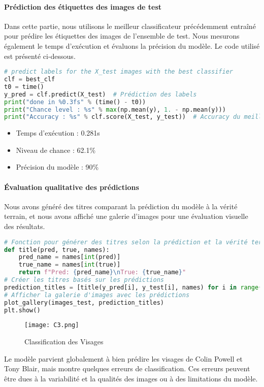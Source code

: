 \documentclass[12pt,a4paper]{report}
\begin{document}
\paragraph{Prédiction des étiquettes des images de test\\}

Dans cette partie, nous utilisons le meilleur classificateur précédemment entraîné pour prédire les étiquettes des images de l'ensemble de test. Nous mesurons également le temps d'exécution et évaluons la précision du modèle. Le code utilisé est présenté ci-dessous.

\begin{lstlisting}[language=Python, caption=Prédiction des étiquettes des images de test avec le meilleur classificateur]
# predict labels for the X_test images with the best classifier
clf = best_clf
t0 = time()
y_pred = clf.predict(X_test)  # Prédiction des labels
print("done in %0.3fs" % (time() - t0))
print("Chance level : %s" % max(np.mean(y), 1. - np.mean(y)))
print("Accuracy : %s" % clf.score(X_test, y_test))  # Accuracy du meilleur modèle
\end{lstlisting}
\begin{itemize}
  \item Temps d'exécution : 0.281s
  \item Niveau de chance : 62.1\%
  \item Précision du modèle : 90\%
\end{itemize}

\paragraph{Évaluation qualitative des prédictions\\}
Nous avons généré des titres comparant la prédiction du modèle à la vérité terrain, et nous avons affiché une galerie d'images pour une évaluation visuelle des résultats.

\begin{lstlisting}[language=Python, caption=Évaluation des prédictions avec Matplotlib]
# Fonction pour générer des titres selon la prédiction et la vérité terrain
def title(pred, true, names):
    pred_name = names[int(pred)]
    true_name = names[int(true)]
    return f"Pred: {pred_name}\nTrue: {true_name}"
# Créer les titres basés sur les prédictions
prediction_titles = [title(y_pred[i], y_test[i], names) for i in range(y_pred.shape[0])]
# Afficher la galerie d'images avec les prédictions
plot_gallery(images_test, prediction_titles)
plt.show()
\end{lstlisting}
\begin{figure}[H]
    \centering
    \begin{minipage}{0.9\textwidth}
        \centering
        \texttt{[image: C3.png]}
        \caption{ Classification des Visages }
    \end{minipage}
    \end{figure}
Le modèle parvient globalement à bien prédire les visages de Colin Powell et Tony Blair, mais montre quelques erreurs de classification. Ces erreurs peuvent être dues à la variabilité et la qualités des images ou à des limitations du modèle.    
\end{document}
